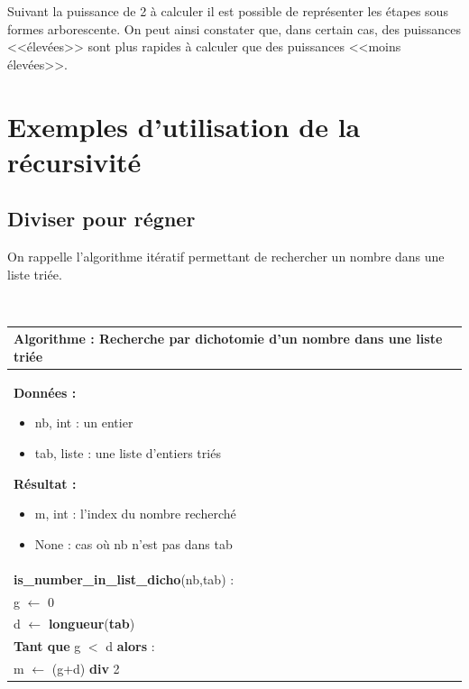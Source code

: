 \documentclass[10pt,fleqn]{article} %
\newcommand{\bfsf}[1]{\small\textbf{\textsf{#1}}}%
\newcommand{\tsf}[1]{\small{\textsf{#1}}}
\begin{document}
Suivant la puissance de 2 à calculer il est possible de représenter les étapes sous formes arborescente. On peut ainsi constater que, dans certain cas, des puissances <<élevées>> sont plus rapides à calculer que des puissances <<moins élevées>>.

\section{Exemples d'utilisation de la récursivité}
\subsection{Diviser pour régner}
On rappelle l'algorithme itératif permettant de rechercher un nombre dans une liste triée. 

\begin{exemple}
~\\
\begin{minipage}[c]{.48\linewidth}
\begin{center}
\begin{tabular}{p{}}
\hline
\textbf{Algorithme :} Recherche par dichotomie d'un nombre dans une liste triée\\
\hline
\textbf{Données :}
\begin{itemize}
\item \tsf{nb}, int : un entier 
\item \tsf{tab}, liste : une liste d'entiers triés
\end{itemize}
\textbf{Résultat :} 
\begin{itemize}
\item \tsf{m}, int : l'index du nombre recherché
\item \tsf{None} : cas où \tsf{nb} n'est pas dans \tsf{tab}
\end{itemize}
\\
\bfsf{is\_number\_in\_list\_dicho}(\tsf{nb},\tsf{tab}) :\\
\hspace{.4cm}\tsf{g} $\leftarrow$ \tsf{0} \\
\hspace{.4cm}\tsf{d} $\leftarrow$ \bfsf{longueur}(\bfsf{tab}) \\
\hspace{.4cm}\bfsf{Tant que} \tsf{g $<$ d} \bfsf{alors} : \\
\hspace{.8cm} \tsf{m} $\leftarrow$ \textsf{(g+d)} \bfsf{div} \textsf{2}\\

\end{tabular}
\end{center}
\end{minipage}
\end{exemple}
\end{document}
